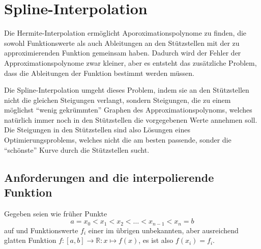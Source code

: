 %
%
%

\section{Spline-Interpolation
\label{buch:section:spline}}
Die Hermite-Interpolation ermöglicht Aporoximationspolynome zu finden,
die sowohl Funktionswerte als auch Ableitungen an den Stützstellen mit
der zu approximierenden Funktion gemeinsam haben.
Dadurch wird der Fehler der Approximationspolynome zwar kleiner, aber
es entsteht das zusätzliche Problem, dass die Ableitungen der
Funktion bestimmt werden müssen.

Die Spline-Interpolation umgeht dieses Problem, indem sie an den
Stützstellen nicht die gleichen Steigungen verlangt, sondern Steigungen,
die zu einem möglichst ``wenig gekrümmten'' Graphen des Approximationspolynoms,
welches natürlich immer noch in den Stützstellen die vorgegebenen Werte
annehmen soll.
Die Steigungen in den Stützstellen sind also Lösungen eines
Optimierungsproblems, welches nicht die am besten passende, sonder
die ``schönste'' Kurve durch die Stützstellen sucht.

%
%
\subsection{Anforderungen and die interpolierende Funktion
\label{buch:subsection:anforderungen}}
Gegeben seien wie früher Punkte
\[
a=x_0< x_1 < x_2< \dots < x_{n-1} < x_n = b
\]
auf und Funktionswerte $f_i$ einer im übrigen unbekannten, aber 
ausreichend glatten Funktion $f\colon [a,b]\to\mathbb R:x\mapsto f(x)$,
es ist also $f(x_i)=f_i$.

